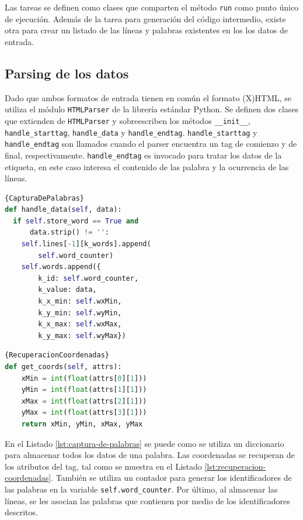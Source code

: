 Las tareas se definen como clases que comparten el método \verb|run| como punto único de ejecución. Además de la tarea para generación del código intermedio, existe otra para crear un listado de las líneas y palabras existentes en los los datos de entrada.

\subsection{Parsing de los datos}

Dado que ambos formatos de entrada tienen en común el formato (X)HTML, se utiliza el módulo \verb|HTMLParser| de la librería estándar Python. Se definen dos clases que extienden de \verb|HTMLParser| y sobreescriben los métodos \verb|__init__|, \verb|handle_starttag|, \verb|handle_data| y \verb|handle_endtag|. \verb|handle_starttag| y \verb|handle_endtag| son llamados cuando el parser encuentra un tag de comienzo y de final, respectivamente. \verb|handle_endtag| es invocado para tratar los datos de la etiqueta, en este caso interesa el contenido de las palabra y la ocurrencia de las líneas.

\noindent\begin{minipage}{.45\textwidth}
    \begin{lstlisting}[language=Python,caption=Captura de las palabras,frame=tlrb,label={lst:captura-de-palabras}]{CapturaDePalabras}
def handle_data(self, data):
  if self.store_word == True and 
      data.strip() != '':
    self.lines[-1][k_words].append(
        self.word_counter)
    self.words.append({
        k_id: self.word_counter,
        k_value: data,
        k_x_min: self.wxMin,
        k_y_min: self.wyMin,
        k_x_max: self.wxMax,
        k_y_max: self.wyMax})
    \end{lstlisting}
\end{minipage}\hfill
\begin{minipage}{.45\textwidth}
    \begin{lstlisting}[language=Python,caption=Recuperación de coordenadas,frame=tlrb,label={lst:recuperacion-coordenadas}]{RecuperacionCoordenadas}
def get_coords(self, attrs):
    xMin = int(float(attrs[0][1]))
    yMin = int(float(attrs[1][1]))
    xMax = int(float(attrs[2][1]))
    yMax = int(float(attrs[3][1]))
    return xMin, yMin, xMax, yMax
    \end{lstlisting}
\end{minipage}

En el Listado \ref{lst:captura-de-palabras} se puede como se utiliza un diccionario para almacenar todos los datos de una palabra. Las coordenadas se recuperan de los atributos del tag, tal como se muestra en el Listado \ref{lst:recuperacion-coordenadas}. También se utiliza un contador para generar los identificadores de las palabras en la variable \verb|self.word_counter|. Por último, al almacenar las líneas, se les asocian las palabras que contienen por medio de los identificadores descritos.

